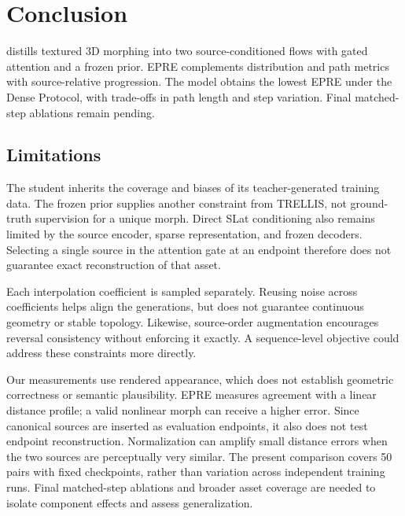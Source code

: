 \section{Conclusion}
\label{sec:conclusion}

\methodname{} distills textured 3D morphing into two source-conditioned
flows with gated attention and a frozen prior. EPRE complements
distribution and path metrics with source-relative progression.
The model obtains the lowest EPRE under the Dense Protocol, with trade-offs in path length
and step variation. Final matched-step ablations remain pending.

\subsection{Limitations}
\label{sec:limitations}

The student inherits the coverage and biases of its teacher-generated
training data. The frozen prior supplies another constraint from TRELLIS,
not ground-truth supervision for a unique morph. Direct SLat conditioning
also remains limited by the source encoder, sparse representation, and
frozen decoders. Selecting a single source in the attention gate at an
endpoint therefore does not guarantee exact reconstruction of that asset.

Each interpolation coefficient is sampled separately. Reusing noise
across coefficients helps align the generations, but does not guarantee
continuous geometry or stable topology. Likewise, source-order
augmentation encourages reversal consistency without enforcing it
exactly. A sequence-level objective could address these constraints more
directly.

Our measurements use rendered appearance, which does not establish
geometric correctness or semantic plausibility. EPRE measures agreement
with a linear distance profile; a valid nonlinear morph can receive a
higher error. Since canonical sources are inserted as evaluation
endpoints, it also does not test endpoint reconstruction. Normalization
can amplify small distance errors when the two sources are perceptually
very similar. The present
comparison covers 50 pairs with fixed checkpoints, rather than variation
across independent training runs. Final matched-step ablations and broader
asset coverage are needed to isolate component effects and assess
generalization.
